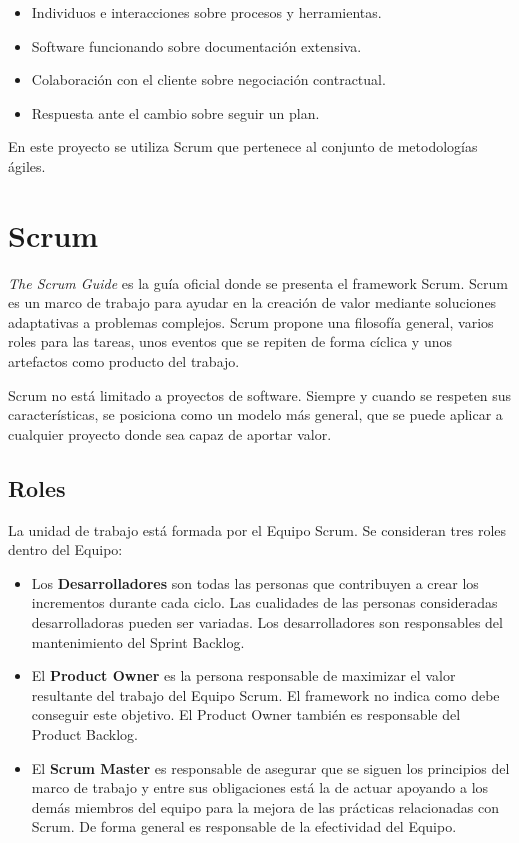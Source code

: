 \begin{itemize}
    \item Individuos e interacciones sobre procesos y herramientas.
    \item Software funcionando sobre documentación extensiva.
    \item Colaboración con el cliente sobre negociación contractual.
    \item Respuesta ante el cambio sobre seguir un plan.
\end{itemize}

En este proyecto se utiliza Scrum que pertenece al conjunto de metodologías ágiles.

\section{Scrum}

\emph{The Scrum Guide} es la guía oficial donde se presenta el framework Scrum. Scrum es un marco de trabajo para ayudar en la creación de valor mediante soluciones adaptativas a problemas complejos. Scrum propone una filosofía general, varios roles para las tareas, unos eventos que se repiten de forma cíclica y unos artefactos como producto del trabajo.

Scrum no está limitado a proyectos de software. Siempre y cuando se respeten sus características, se posiciona como un modelo más general, que se puede aplicar a cualquier proyecto donde sea capaz de aportar valor.

\subsection{Roles}

La unidad de trabajo está formada por el Equipo Scrum. Se consideran tres roles dentro del Equipo:

\begin{itemize}
    \item Los \textbf{Desarrolladores} son todas las personas que contribuyen a crear los incrementos durante cada ciclo. Las cualidades de las personas consideradas desarrolladoras pueden ser variadas. Los desarrolladores son responsables del mantenimiento del Sprint Backlog.
    \item El \textbf{Product Owner} es la persona responsable de maximizar el valor resultante del trabajo del Equipo Scrum. El framework no indica como debe conseguir este objetivo. El Product Owner también es responsable del Product Backlog.
    \item El \textbf{Scrum Master} es responsable de asegurar que se siguen los principios del marco de trabajo y entre sus obligaciones está la de actuar apoyando a los demás miembros del equipo para la mejora de las prácticas relacionadas con Scrum. De forma general es responsable de la efectividad del Equipo.
\end{itemize}

